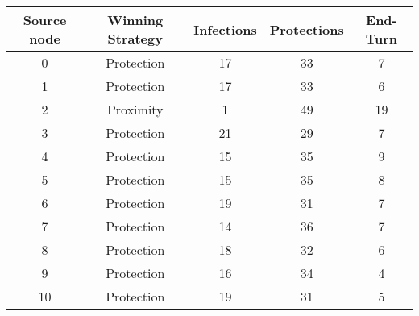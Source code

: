 \documentclass[results.tex]{subfiles}
\begin{document}
    \begin{center}
        \begin{tabular}{| c || c | c | c | c |}
            \hline
            {\bfseries Source node} & {\bfseries Winning Strategy} & {\bfseries Infections} & {\bfseries Protections}
            & {\bfseries End-Turn}
            \\  %
            \hline\hline
            0                       & Protection                   & 17                     & 33                      & 7                    \\
            \hline
            1                       & Protection                   & 17                     & 33                      & 6                    \\
            \hline
            2                       & Proximity                    & 1                      & 49                      & 19                   \\
            \hline
            3                       & Protection                   & 21                     & 29                      & 7                    \\
            \hline
            4                       & Protection                   & 15                     & 35                      & 9                    \\
            \hline
            5                       & Protection                   & 15                     & 35                      & 8                    \\
            \hline
            6                       & Protection                   & 19                     & 31                      & 7                    \\
            \hline
            7                       & Protection                   & 14                     & 36                      & 7                    \\
            \hline
            8                       & Protection                   & 18                     & 32                      & 6                    \\
            \hline
            9                       & Protection                   & 16                     & 34                      & 4                    \\
            \hline
            10                      & Protection                   & 19                     & 31                      & 5                    \\

\end{tabular}
\end{center}
\end{document}
